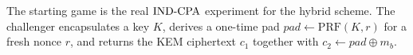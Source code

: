 The starting game is the real $\mathrm{IND\text{-}CPA}$ experiment for the hybrid scheme.
The challenger encapsulates a key $K$, derives a one-time pad
$\mathit{pad} \gets \mathrm{PRF}(K, r)$ for a fresh nonce $r$, and returns the
KEM ciphertext $c_1$ together with $c_2 \gets \mathit{pad} \oplus m_b$.
